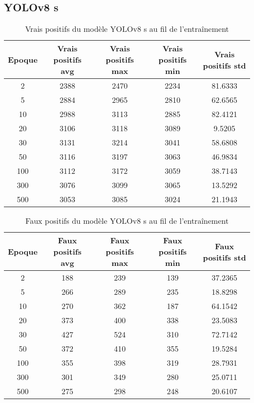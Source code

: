 
\clearpage
\subsection{YOLOv8 s}

\begin{table}[!ht]
    \caption{Vrais positifs du modèle YOLOv8 s au fil de l'entraînement}
    \label{tab:yolov8s_true_positive}
    \centering
    \begin{tabular}{ |c||c|c|c|c|  }
        \hline
        \rowcolor{gray!50}
        Epoque & Vrais positifs avg & Vrais positifs max & Vrais positifs min & Vrais positifs std\\
        \hline
        2 & 2388 & 2470 & 2234 & 81.6333\\
        5 & 2884 & 2965 & 2810 & 62.6565\\
        10 & 2988 & 3113 & 2885 & 82.4121\\
        20 & 3106 & 3118 & 3089 & 9.5205\\
        30 & 3131 & 3214 & 3041 & 58.6808\\
        50 & 3116 & 3197 & 3063 & 46.9834\\
        100 & 3112 & 3172 & 3059 & 38.7143\\
        300 & 3076 & 3099 & 3065 & 13.5292\\
        500 & 3053 & 3085 & 3024 & 21.1943\\
        \hline
    \end{tabular}
\end{table}

\begin{table}[!ht]
    \caption{Faux positifs du modèle YOLOv8 s au fil de l'entraînement}
    \label{tab:yolov8s_false_positive}
    \centering
    \begin{tabular}{ |c||c|c|c|c|  }
        \hline
        \rowcolor{gray!50}
        Epoque & Faux positifs avg & Faux positifs max & Faux positifs min & Faux positifs std\\
        \hline
        2 & 188 & 239 & 139 & 37.2365\\
        5 & 266 & 289 & 235 & 18.8298\\
        10 & 270 & 362 & 187 & 64.1542\\
        20 & 373 & 400 & 338 & 23.5083\\
        30 & 427 & 524 & 310 & 72.7142\\
        50 & 372 & 410 & 355 & 19.5284\\
        100 & 355 & 398 & 319 & 28.7931\\
        300 & 301 & 349 & 280 & 25.0711\\
        500 & 275 & 298 & 248 & 20.6107\\
        \hline
    \end{tabular}
\end{table}

